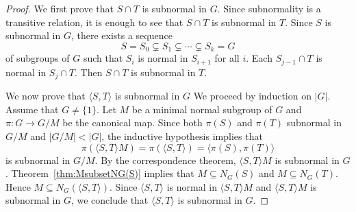 \begin{proof}
	We first prove that $S\cap T$ is subnormal in $G$. Since subnormality is a transitive relation, it is enough to see that 
	$S\cap T$ is subnormal in $T$.
	Since $S$ is subnormal in $G$, there exists a sequence 
	\[
		S=S_0\subsetneq S_1\subsetneq \cdots\subsetneq S_k=G
	\]
    of subgroups of $G$ such that $S_i$ is normal in $S_{i+1}$ for all $i$. 
	Each $S_{j-1}\cap T$ is normal in $S_j\cap T$. Then $S\cap T$ is 
	subnormal in $T$.
	
	
	We now prove that $\langle S,T\rangle$ is subnormal in $G$ 
	We proceed by induction on $|G|$. Assume that $G\ne\{1\}$. Let $M$ be a minimal normal subgroup of $G$ and 
    $\pi\colon G\to G/M$ be the canonical map. Since 
	both $\pi(S)$ and $\pi(T)$ subnormal in $G/M$ and $|G/M|<|G|$,
	the inductive hypothesis implies that 
	\[
	\pi(\langle S,T\rangle M)=\pi(\langle S,T\rangle)=\langle \pi(S),\pi(T)\rangle
	\]
	is subnormal in $G/M$. By the correspondence theorem, $\langle S,T\rangle M$ is 
	subnormal in $G$. Theorem~\ref{thm:MsubsetNG(S)}
	implies that $M\subseteq N_G(S)$ and $M\subseteq N_G(T)$. Hence $M\subseteq
	N_G(\langle S,T\rangle)$. Since $\langle S,T\rangle$ is normal in
	$\langle S,T\rangle M$ and $\langle S,T\rangle M$ is subnormal in $G$, we conclude that 
	$\langle S,T\rangle$ is subnormal in $G$.
\end{proof}


